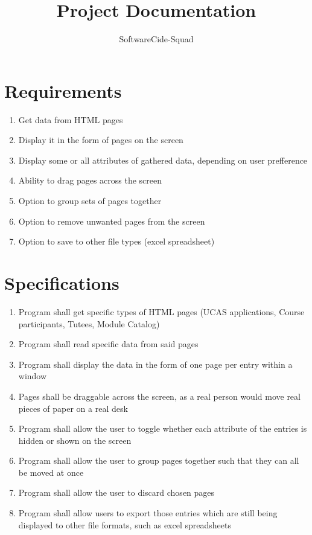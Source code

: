 \documentclass[12pt]{article}
\begin{document}
\title{Project Documentation}
\author{SoftwareCide-Squad}
\maketitle

\section{Requirements}
\begin{enumerate}
\item Get data from HTML pages
\item Display it in the form of pages on the screen
\item Display some or all attributes of gathered data, depending on user prefference
\item Ability to drag pages across the screen
\item Option to group sets of pages together
\item Option to remove unwanted pages from the screen
\item Option to save to other file types (excel spreadsheet)
\end{enumerate}

\section{Specifications}
\begin{enumerate}
\item Program shall get specific types of HTML pages (UCAS applications, Course participants, Tutees, Module Catalog)
\item Program shall read specific data from said pages
\item Program shall display the data in the form of one page per entry within a window
\item Pages shall be draggable across the screen, as a real person would move real pieces of paper on a real desk
\item Program shall allow the user to toggle whether each attribute of the entries is hidden or shown on the screen
\item Program shall allow the user to group pages together such that they can all be moved at once
\item Program shall allow the user to discard chosen pages
\item Program shall allow users to export those entries which are still being displayed to other file formats, such as excel spreadsheets
\end{enumerate}
\end{document}
